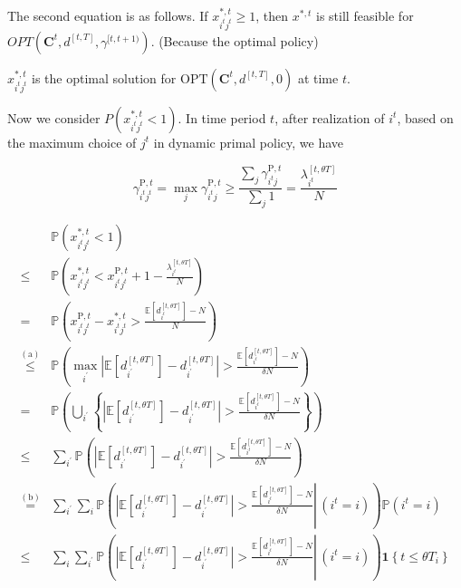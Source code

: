 The second equation is as follows. If $x_{i^{t}j^{t}}^{*,t} \geq 1$, then $x^{*,t}$ is still feasible for $OPT(\bm{C}^{t}, d^{[t, T]}, \gamma^{[t,t+1)})$. (Because the optimal policy)

$x_{i^{t}j^{t}}^{*,t}$ is the optimal solution for $\text{OPT}(\bm{C}^{t}, d^{[t, T]}, 0)$ at time $t$.

Now we consider $P(x_{i^{t}j^{t}}^{*,t} <1)$. In time period $t$, after realization of $i^{t}$, based on the maximum choice of $j^{t}$ in dynamic primal policy, we have

$$
\gamma_{i^t j^t}^{\mathrm{P}, t}=\max_{j} \gamma_{i^t j}^{\mathrm{P}, t} \geqslant \frac{\sum_{j} \gamma_{i^t j}^{\mathrm{P}, t}}{\sum_{j} 1} = \frac{\lambda_{i^t}^{[t, \theta T]}}{N}
$$


$$
\begin{aligned}
& \mathbb{P}\left(x_{i^{t}j^{t}}^{*,t} <1\right) \\
\leqslant & \mathbb{P}\left(x_{i^{t}j^{t}}^{*,t} < x_{i^{t}j^{t}}^{\mathrm{P}, t}+1-\frac{\lambda_{i^t}^{[t, \theta T]}}{N}\right) \\
= & \mathbb{P}\left(x_{i^{t}j^{t}}^{\mathrm{P}, t} - x_{i^{t}j^{t}}^{*,t} > \frac{\mathbb{E}\left[d_{i^t}^{[t, \theta T]}\right]-N}{N}\right) \\
\stackrel{(\mathrm{a})}{\leqslant} & \mathbb{P}\left(\max_{i^{\prime}}\left|\mathbb{E}\left[d_{i^{\prime}}^{[t, \theta T]}\right]-d_{i^{\prime}}^{[t, \theta T]}\right|> \frac{\mathbb{E}\left[d_{i^t}^{[t, \theta T]}\right]-N}{\delta N} \right) \\
= & \mathbb{P}\left(\bigcup_{i^{\prime}}\left\{\left|\mathbb{E}\left[d_{i^{\prime}}^{[t, \theta T]}\right] - d_{i^{\prime}}^{[t, \theta T]}\right|> \frac{\mathbb{E}\left[d_{i^t}^{[t, \theta T]}\right]-N}{\delta N} \right\}\right) \\
\leqslant & \sum_{i^{\prime}} \mathbb{P}\left(\left|\mathbb{E}\left[d_{i^{\prime}}^{[t, \theta T]}\right]-d_{i^{\prime}}^{[t, \theta T]}\right|> \frac{\mathbb{E}\left[d_{i^t}^{[t, \theta T]}\right]-N}{\delta N}\right) \\
\stackrel{(\mathrm{b})}{=} & \sum_{i^{\prime}} \sum_{i} \mathbb{P}\left(\left.\left|\mathbb{E}\left[d_{i^{\prime}}^{[t, \theta T]}\right]-d_{i^{\prime}}^{[t, \theta T]}\right| > \frac{\mathbb{E}\left[d_{i^t}^{[t, \theta T]}\right]-N}{\delta N} \right\rvert\,\left(i^t = i\right) \right) \mathbb{P}\left(i^t = i \right)  \\
\leqslant & \sum_{i} \sum_{i^{\prime}} \mathbb{P}\left(\left.\left|\mathbb{E}\left[d_{i^{\prime}}^{[t, \theta T]}\right]-d_{i^{\prime}}^{[t, \theta T]}\right| > \frac{\mathbb{E}\left[d_{i^t}^{[t, \theta T]}\right]-N}{\delta N} \right\rvert\,\left(i^t = i\right) \right) \bm{1}\left\{t \leqslant \theta T_{i}\right\} \\

\end{aligned}$$

